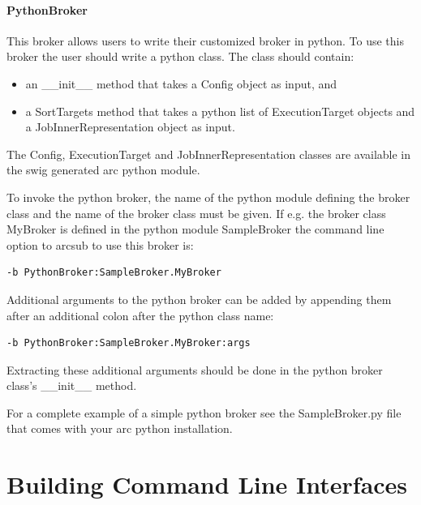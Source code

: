 \documentclass{book}
\begin{document}
   
   
\subsubsection{PythonBroker}

This broker allows users to write their customized broker in
python. To use this broker the user should write a python class. The
class should contain:

\begin{itemize}

\item{an \_\_init\_\_ method that takes a Config object as input, and}
\item{a SortTargets method that takes a python list of ExecutionTarget
  objects and a JobInnerRepresentation object as input.}

\end{itemize}

The Config, ExecutionTarget and JobInnerRepresentation classes are
available in the swig generated arc python module.

To invoke the python broker, the name of the python module defining
the broker class and the name of the broker class must be given. If
e.g. the broker class MyBroker is defined in the python module
SampleBroker the command line option to arcsub to use this broker is:

\begin{shaded}
\begin{verbatim}
-b PythonBroker:SampleBroker.MyBroker
\end{verbatim}
\end{shaded}

Additional arguments to the python broker can be added by appending
them after an additional colon after the python class name:

\begin{shaded}
\begin{verbatim}
-b PythonBroker:SampleBroker.MyBroker:args
\end{verbatim}
\end{shaded}

Extracting these additional arguments should be done in the python
broker class's \_\_init\_\_ method.

For a complete example of a simple python broker see the
SampleBroker.py file that comes with your arc python installation.

\chapter{Building Command Line Interfaces}
\label{sec:cli}
\end{document}
